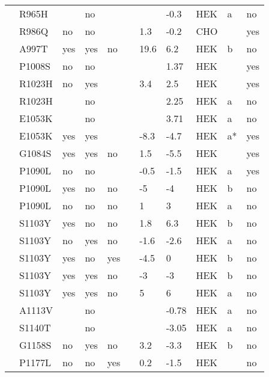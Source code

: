 \begin{tiny}
\begin{longtable}{p{4cm}|l|llll|ll|lll}
\citet{Hoshi2014MutationDB} & R965H &  & no &  &  &  & -0.3 & HEK & a & no \\
\citet{Hayashi2015MutationDB} & R986Q & no & no &  &  & 1.3 & -0.2 & CHO &  & yes \\
\citet{Beyder2014MutationDB} & A997T & yes & yes & no &  & 19.6 & 6.2 & HEK & b & no \\
\citet{Hu2010MutationDB} & P1008S & no & no &  &  &  & 1.37 & HEK &  & yes \\
\citet{Frustaci2005MutationDB} & R1023H & no & yes &  &  & 3.4 & 2.5 & HEK &  & yes \\
\citet{Hoshi2014MutationDB} & R1023H &  & no &  &  &  & 2.25 & HEK & a & no \\
\citet{Hoshi2014MutationDB} & E1053K &  & no &  &  &  & 3.71 & HEK & a & no \\
\citet{Mohler2004MutationDB} & E1053K & yes & yes &  &  & -8.3 & -4.7 & HEK & a* & yes \\
\citet{Otagiri2008MutationDB} & G1084S & yes & yes & no &  & 1.5 & -5.5 & HEK &  & yes \\
\citet{Juang2014aMutationDB} & P1090L & no & no &  &  & -0.5 & -1.5 & HEK & a & yes \\
\citet{Tan2005MutationDB} & P1090L & yes & no & no &  & -5 & -4 & HEK & b & no \\
\citet{Tan2005MutationDB} & P1090L & no & no & no &  & 1 & 3 & HEK & a & no \\
\citet{Cheng2011MutationDB} & S1103Y & yes & no & no &  & 1.8 & 6.3 & HEK & b & no \\
\citet{Cheng2011MutationDB} & S1103Y & no & yes & no &  & -1.6 & -2.6 & HEK & a & no \\
\citet{Splawski2002MutationDB} & S1103Y & yes & no & yes &  & -4.5 & 0 & HEK & b & no \\
\citet{Tan2005MutationDB} & S1103Y & yes & yes & no &  & -3 & -3 & HEK & b & no \\
\citet{Tan2005MutationDB} & S1103Y & yes & yes & no &  & 5 & 6 & HEK & a & no \\
\citet{Hoshi2014MutationDB} & A1113V &  & no &  &  &  & -0.78 & HEK & a & no \\
\citet{Hoshi2014MutationDB} & S1140T &  & no &  &  &  & -3.05 & HEK & a & no \\
\citet{Beyder2014MutationDB} & G1158S & no & yes & no &  & 3.2 & -3.3 & HEK & b & no \\
\citet{Winkel2012MutationDB} & P1177L & no & no & yes &  & 0.2 & -1.5 & HEK &  & no \\

\end{longtable}
\end{tiny}
